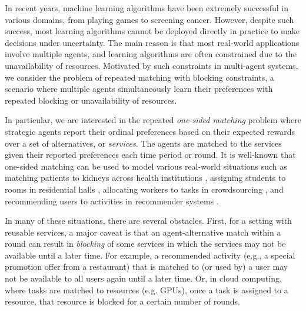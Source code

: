 \documentclass[letterpaper,11pt]{article}
\begin{document}
In recent years, machine learning algorithms have been extremely successful in various domains, from playing games to screening cancer. However, despite such success, most learning algorithms cannot be deployed directly in practice to make decisions under uncertainty. The main reason is that most real-world applications involve multiple agents, and learning algorithms are often constrained due to the unavailability of resources. Motivated by such constraints in multi-agent systems, we consider the problem of repeated matching with blocking constraints, a scenario where multiple agents simultaneously learn their preferences with repeated blocking or unavailability of resources.

In particular, we are interested in the repeated \emph{one-sided matching} problem where strategic agents report their ordinal preferences based on their expected rewards over a set of alternatives, or \emph{services}. The agents are matched to the services given their reported preferences each time period or round. It is well-known that one-sided matching can be used to model various real-world situations such as matching patients to kidneys across health institutions  \cite{Durlauf:2008uq,Roth:2004ue}, assigning students to rooms in residential halls \cite{Durlauf:2008uq}, allocating workers to tasks in crowdsourcing  \cite{Difallah:2013uo,Aldhahri:2015vb}, and recommending users to activities in recommender systems  \cite{Satzger:2006tp,Ansari:2000uv,Isinkaye:2015vv}. 

In many of these situations, there are several obstacles. First, for a setting with reusable services, 
a major caveat is that an agent-alternative match within a round can result in 
\emph{blocking} of some services in which 
the services may not be available until a later time. 
For example, a recommended activity (e.g., a special promotion offer from a restaurant) that is matched to (or used by) a user may not be available to all users again until a later time. Or, in cloud computing, where tasks are matched to resources (e.g. GPUs), once a task is assigned to a resource, that resource is blocked for a certain number of rounds.  

\end{document}
